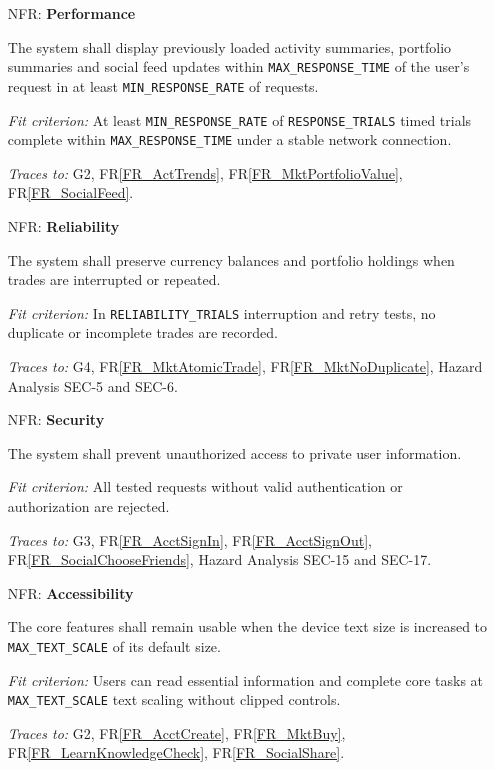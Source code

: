 \documentclass[12pt]{article}
\newcommand{\rref}[1]{FR\ref{#1}}
\newcounter{nfrnum} %
\newcommand{\scref}[1]{SC\ref{#1}}
\begin{document}
\begin{itemize}
  \textit{Fit criterion:} Core acceptance tests pass on both supported
  operating systems.

  \textit{Traces to:} G2, G3, G4, G5,
  \scref{SC_Platform}, \scref{SC_HealthPlatform}.

\item[NFR\refstepcounter{nfrnum}\thenfrnum \label{NFR_Performance}:]
  \textbf{Performance}

  The system shall display previously loaded activity summaries, portfolio
  summaries and social feed updates
  within \texttt{MAX\_RESPONSE\_TIME} of the user's request in at least
  \texttt{MIN\_RESPONSE\_RATE} of requests.

  \textit{Fit criterion:} At least \texttt{MIN\_RESPONSE\_RATE} of
  \texttt{RESPONSE\_TRIALS} timed trials complete within
  \texttt{MAX\_RESPONSE\_TIME} under a stable network connection.

  \textit{Traces to:} G2,
  \rref{FR_ActTrends}, \rref{FR_MktPortfolioValue},
  \rref{FR_SocialFeed}.

\item[NFR\refstepcounter{nfrnum}\thenfrnum \label{NFR_Reliability}:]
  \textbf{Reliability}

  The system shall preserve currency balances and portfolio holdings when
  trades are interrupted or repeated.

  \textit{Fit criterion:} In \texttt{RELIABILITY\_TRIALS} interruption and
  retry tests, no duplicate or incomplete trades are recorded.

  \textit{Traces to:} G4,
  \rref{FR_MktAtomicTrade}, \rref{FR_MktNoDuplicate},
  Hazard Analysis SEC-5 and SEC-6.

\item[NFR\refstepcounter{nfrnum}\thenfrnum \label{NFR_Security}:]
  \textbf{Security}

  The system shall prevent unauthorized access to
  private user information.

  \textit{Fit criterion:} All tested requests without
  valid authentication or authorization are rejected.

  \textit{Traces to:} G3,
  \rref{FR_AcctSignIn}, \rref{FR_AcctSignOut},
  \rref{FR_SocialChooseFriends},
  Hazard Analysis SEC-15 and SEC-17.

\item[NFR\refstepcounter{nfrnum}\thenfrnum \label{NFR_Accessibility}:]
  \textbf{Accessibility}

  The core features shall remain usable when the device text size is increased
  to \texttt{MAX\_TEXT\_SCALE} of its default size.

  \textit{Fit criterion:} Users can read essential information and complete
  core tasks at \texttt{MAX\_TEXT\_SCALE} text scaling without clipped
  controls.

  \textit{Traces to:} G2,
  \rref{FR_AcctCreate}, \rref{FR_MktBuy},
  \rref{FR_LearnKnowledgeCheck},
  \rref{FR_SocialShare}.

\end{itemize}
\end{document}
